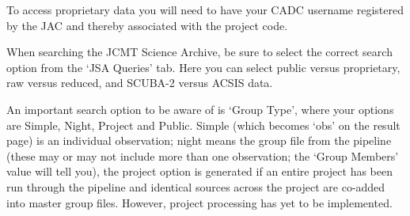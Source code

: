 \documentclass[twoside,11pt]{article}
\renewcommand{\_}{\texttt{\symbol{95}}}
\begin{document}
To access proprietary data you will need to have your CADC username
registered by the JAC and thereby associated with the project code.

When searching the JCMT Science Archive, be sure to select the correct
search option from the `JSA Queries' tab. Here you can select public
versus proprietary, raw versus reduced, and SCUBA-2 versus ACSIS data.

An important search option to be aware of is `Group Type', where your
options are Simple, Night, Project and Public. Simple (which becomes
`obs' on the result page) is an individual observation; night means
the group file from the pipeline (these may or may not include more
than one observation; the `Group Members' value will tell you), the
project option is generated if an entire project has been run through
the pipeline and identical sources across the project are co-added
into master group files.  However, project processing has yet to be
implemented.


\clearpage
\end{document}

